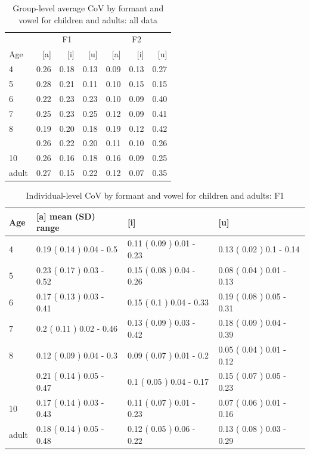 \documentclass[
]{article}
\begin{document}
\begin{table}[!h]

\caption{\label{tab:delta-disp-tbl-group-alldata}Group-level average CoV by formant and vowel for children and adults: all data}
\centering
\begin{tabular}[t]{lrrrrrr}
\toprule
\multicolumn{1}{c}{ } & \multicolumn{3}{c}{F1} & \multicolumn{3}{c}{F2} \\
\cmidrule(l{3pt}r{3pt}){2-4} \cmidrule(l{3pt}r{3pt}){5-7}
Age & [a] & [i] & [u] & [a]  & [i]  & [u] \\
\midrule
4 & 0.26 & 0.18 & 0.13 & 0.09 & 0.13 & 0.27\\
5 & 0.28 & 0.21 & 0.11 & 0.10 & 0.15 & 0.15\\
6 & 0.22 & 0.23 & 0.23 & 0.10 & 0.09 & 0.40\\
7 & 0.25 & 0.23 & 0.25 & 0.12 & 0.09 & 0.41\\
8 & 0.19 & 0.20 & 0.18 & 0.19 & 0.12 & 0.42\\
\addlinespace
9 & 0.26 & 0.22 & 0.20 & 0.11 & 0.10 & 0.26\\
10 & 0.26 & 0.16 & 0.18 & 0.16 & 0.09 & 0.25\\
adult & 0.27 & 0.15 & 0.22 & 0.12 & 0.07 & 0.35\\
\bottomrule
\end{tabular}
\end{table}

\begin{table}[!h]

\caption{\label{tab:delta-disp-tbl-spkr-alldata-f1}Individual-level CoV by formant and vowel for children and adults: F1}
\centering
\begin{tabular}[t]{llll}
\toprule
Age & [a] mean (SD) range & [i] & [u]\\
\midrule
4 & 0.19 ( 0.14 ) 0.04 - 0.5 & 0.11 ( 0.09 ) 0.01 - 0.23 & 0.13 ( 0.02 ) 0.1 - 0.14\\
5 & 0.23 ( 0.17 ) 0.03 - 0.52 & 0.15 ( 0.08 ) 0.04 - 0.26 & 0.08 ( 0.04 ) 0.01 - 0.13\\
6 & 0.17 ( 0.13 ) 0.03 - 0.41 & 0.15 ( 0.1 ) 0.04 - 0.33 & 0.19 ( 0.08 ) 0.05 - 0.31\\
7 & 0.2 ( 0.11 ) 0.02 - 0.46 & 0.13 ( 0.09 ) 0.03 - 0.42 & 0.18 ( 0.09 ) 0.04 - 0.39\\
8 & 0.12 ( 0.09 ) 0.04 - 0.3 & 0.09 ( 0.07 ) 0.01 - 0.2 & 0.05 ( 0.04 ) 0.01 - 0.12\\
\addlinespace
9 & 0.21 ( 0.14 ) 0.05 - 0.47 & 0.1 ( 0.05 ) 0.04 - 0.17 & 0.15 ( 0.07 ) 0.05 - 0.23\\
10 & 0.17 ( 0.14 ) 0.03 - 0.43 & 0.11 ( 0.07 ) 0.01 - 0.23 & 0.07 ( 0.06 ) 0.01 - 0.16\\
adult & 0.18 ( 0.14 ) 0.05 - 0.48 & 0.12 ( 0.05 ) 0.06 - 0.22 & 0.13 ( 0.08 ) 0.03 - 0.29\\
\bottomrule
\end{tabular}
\end{table}
\end{document}
